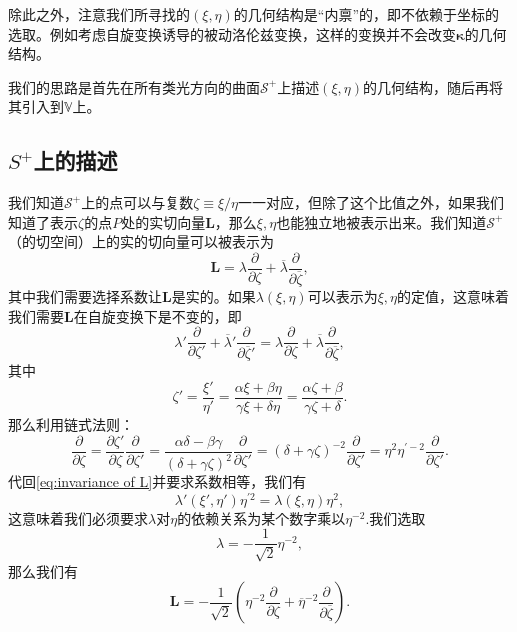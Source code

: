 除此之外，注意我们所寻找的$( \xi ,\eta )$的几何结构是“内禀”的，即不依赖于坐标的选取。例如考虑自旋变换诱导的被动洛伦兹变换，这样的变换并不会改变$\boldsymbol{\kappa }$的几何结构。



我们的思路是首先在所有类光方向的曲面$\mathcal{S}^{+}$上描述$( \xi ,\eta )$的几何结构，随后再将其引入到$\mathbb{V}$上。


\subsection{$S^{+}$上的描述}

我们知道$\mathcal{S}^{+}$上的点可以与复数$\zeta \equiv \xi /\eta $一一对应，但除了这个比值之外，如果我们知道了表示$\zeta $的点$P$处的实切向量$\mathbf{L}$，那么$\xi ,\eta $也能独立地被表示出来。我们知道$\mathcal{S}^{+}$（的切空间）上的实的切向量可以被表示为
\begin{equation*}
	\mathbf{L} =\lambda \frac{\partial }{\partial \zeta } +\overline{\lambda }\frac{\partial }{\partial \overline{\zeta }} ,
\end{equation*}
其中我们需要选择系数让$\mathbf{L}$是实的。如果$\lambda ( \xi ,\eta )$可以表示为$\xi ,\eta $的定值，这意味着我们需要$\mathbf{L}$在自旋变换下是不变的，即
\begin{equation}
	\lambda '\frac{\partial }{\partial \zeta '} +\overline{\lambda } '\frac{\partial }{\partial \overline{\zeta } '} =\lambda \frac{\partial }{\partial \zeta } +\overline{\lambda }\frac{\partial }{\partial \overline{\zeta }} ,
	\label{eq:invariance of L}
\end{equation}
其中
\begin{equation*}
	\zeta '=\frac{\xi '}{\eta '} =\frac{\alpha \xi +\beta \eta }{\gamma \xi +\delta \eta } =\frac{\alpha \zeta +\beta }{\gamma \zeta +\delta } .
\end{equation*}
那么利用链式法则：
\begin{equation}
	\frac{\partial }{\partial \zeta } =\frac{\partial \zeta '}{\partial \zeta }\frac{\partial }{\partial \zeta '} =\frac{\alpha \delta -\beta \gamma }{(\delta +\gamma \zeta )^{2}}\frac{\partial }{\partial \zeta '} =(\delta +\gamma \zeta )^{-2}\frac{\partial }{\partial \zeta '} =\eta ^{2} \eta ^{\prime -2}\frac{\partial }{\partial \zeta '} .
	\label{eq:chain rule of xi}
\end{equation}
代回\ref{eq:invariance of L}并要求系数相等，我们有
\begin{equation*}
	\lambda '( \xi ',\eta ') \eta ^{\prime 2} =\lambda ( \xi ,\eta ) \eta ^{2} ,
\end{equation*}
这意味着我们必须要求$\lambda $对$\eta $的依赖关系为某个数字乘以$\eta ^{-2}$.我们选取
\begin{equation*}
	\lambda =-\frac{1}{\sqrt{2}} \eta ^{-2} ,
\end{equation*}
那么我们有
\begin{equation}
	\mathbf{L} =-\frac{1}{\sqrt{2}}\left( \eta ^{-2}\frac{\partial }{\partial \zeta } +\overline{\eta }^{-2}\frac{\partial }{\partial \overline{\zeta }}\right) .
	\label{eq:expression of L}
\end{equation}


